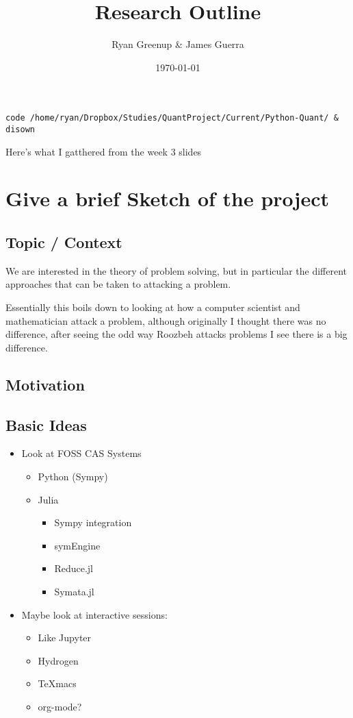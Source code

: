 \documentclass[11pt]{article}
\author{Ryan Greenup \& James Guerra}
\date{\today}
\title{Research Outline}
\begin{document}
\maketitle
\tableofcontents

\begin{verbatim}
code /home/ryan/Dropbox/Studies/QuantProject/Current/Python-Quant/ & disown
\end{verbatim}

Here's what I gatthered from the week 3 slides

\section{Give a brief Sketch of the project}
\label{sec:orgb321674}

\subsection{Topic / Context}
\label{sec:org55f4360}
We are interested in the theory of problem solving, but in particular the
different approaches that can be taken to attacking a problem.

Essentially this boils down to looking at how a computer scientist and
mathematician attack a problem, although originally I thought there was no
difference, after seeing the odd way Roozbeh attacks problems I see there is a big difference.
\subsection{Motivation}
\label{sec:orgccbd7ea}

\subsection{Basic Ideas}
\label{sec:orgb16a446}
\begin{itemize}
\item Look at FOSS CAS Systems
\begin{itemize}
\item Python (Sympy)
\item Julia
\begin{itemize}
\item Sympy integration
\item symEngine
\item Reduce.jl
\item Symata.jl
\end{itemize}
\end{itemize}

\item Maybe look at interactive sessions:
\begin{itemize}
\item Like Jupyter
\item Hydrogen
\item TeXmacs
\item org-mode?
\end{itemize}
\end{itemize}
\end{document}
